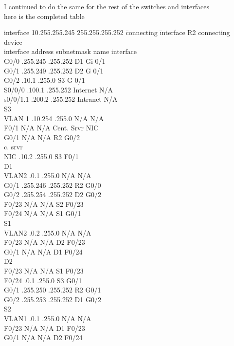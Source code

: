 \documentclass[../EngineeringJournal_CDavis.tex]{subfiles}
\begin{document}
I continued to do the same for the rest of the switches and interfaces
\hfill \break
{}
\\ here is the completed table
\begin{tabbing}
  interface \= 10.255.255.245 \= 255.255.255.252 \= connecting \= interface\kill
  R2 \> \> \> connecting \> device\\
interface \> address \> subnetmask \> name \> interface\\
G0/0 .255.245 .255.252 \> D1 \> Gi 0/1 \\
G0/1 .255.249 .255.252 \> D2 \> G 0/1 \\
G0/2 .10.1 .255.0 \> S3 \> G 0/1 \\
S0/0/0 .100.1 .255.252 \> Internet \> N/A \\
s0/0/1.1 .200.2 .255.252 \> Intranet \> N/A \\
S3 \>  \> \> \> \\
VLAN 1 .10.254 .255.0 \> N/A \> N/A \\
F0/1 \> N/A \> N/A \> Cent. Srvr \> NIC \\
G0/1 \> N/A \> N/A \> R2 \> G0/2 \\
c. srvr \\ 
NIC .10.2 .255.0 \> S3 \> F0/1 \\
D1 \> \> \> \> \\
VLAN2 .0.1 .255.0 \> N/A \> N/A\\
G0/1 .255.246 .255.252 \> R2 \> G0/0 \\
G0/2 .255.254 .255.252 \> D2 \> G0/2 \\
F0/23 \> N/A \> N/A \> S2 \> F0/23 \\
F0/24\> N/A \> N/A \> S1 \> G0/1 \\
S1 \> \> \> \> \\
VLAN2 .0.2 .255.0 \> N/A \> N/A \\
F0/23 \> N/A \> N/A \> D2 \> F0/23 \\
G0/1 \> N/A \> N/A \> D1 \> F0/24 \\
D2 \> \> \> \> \\
F0/23 \> N/A \> N/A \> S1 \> F0/23 \\
F0/24 .0.1 .255.0 \> S3 \> G0/1 \\
G0/1 .255.250 .255.252 \> R2 \> G0/1 \\
G0/2 .255.253 .255.252 \> D1 \> G0/2 \\
S2 \> \> \> \> \\
VLAN1 .0.1 .255.0 \> N/A \> N/A \\
F0/23 \> N/A \> N/A \> D1 \> F0/23 \\
G0/1 \> N/A \> N/A \> D2 \> F0/24 
\end{tabbing}
\end{document}
